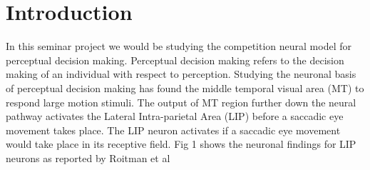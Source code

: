 \chapter{Introduction}

In this seminar project we would be studying the competition neural model for perceptual decision making. Perceptual decision making refers to the decision making of an individual with respect to perception. Studying the neuronal basis of perceptual decision making has found the middle temporal visual area (MT) to respond large motion stimuli. The output of MT region further down the neural pathway activates the Lateral Intra-parietal Area (LIP) before a saccadic eye movement takes place. The LIP neuron activates if a saccadic eye movement would take place in its receptive field. Fig 1 shows the neuronal findings for LIP neurons as reported by Roitman et al \cite{roitman2002response}